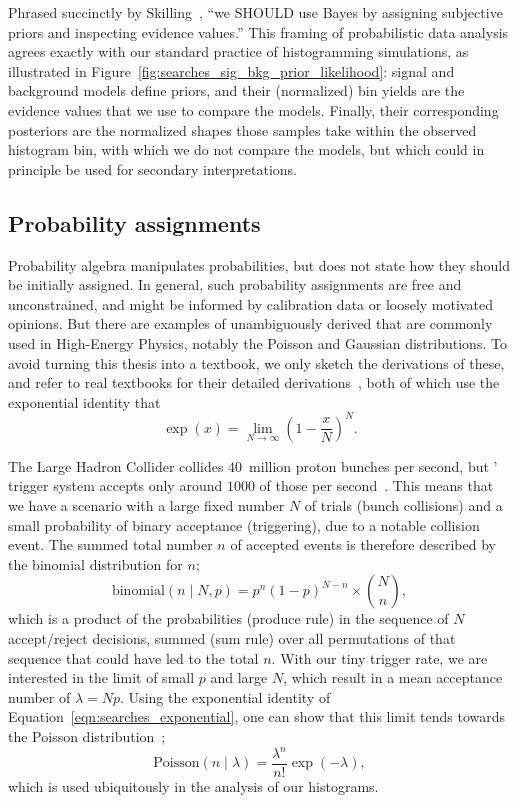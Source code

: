 Phrased succinctly by Skilling~\cite{skilling2008rant},
``we SHOULD use Bayes by assigning subjective priors and inspecting evidence
values.''
This framing of probabilistic data analysis agrees exactly with our standard
practice of histogramming simulations,
as illustrated in Figure~\ref{fig:searches_sig_bkg_prior_likelihood}:
signal and background models define priors, and their (normalized) bin yields
are the evidence values that we use to compare the models.
Finally, their corresponding posteriors are the normalized shapes those samples
take within the observed histogram bin, with which we do not compare the
models, but which could in principle be used for secondary interpretations.

\subsection{Probability assignments}
Probability algebra manipulates probabilities, but does not state how they
should be initially assigned.
In general, such probability assignments are free and unconstrained, and might
be informed by calibration data or loosely motivated opinions.
But there are examples of unambiguously derived that are commonly used in
High-Energy Physics, notably the Poisson and Gaussian distributions.
To avoid turning this thesis into a textbook, we only sketch the derivations
of these, and refer to real textbooks for their detailed
derivations~\cite{jaynes2003probability}, both of which use the exponential
identity that
\begin{equation}
\label{eqn:searches_exponential}
\exp(x) = \displaystyle \lim_{N \to \infty}
\left(1 - \frac{x}{N}\right)^N
.
\end{equation}

The Large Hadron Collider collides $40$~million proton bunches per second,
but \atlas' trigger system accepts only around $1000$ of
those per second~\cite{atlas2020trigger}.
This means that we have a scenario with a large fixed number $N$ of trials
(bunch collisions)
and a small probability of binary acceptance (triggering),
due to a notable collision event.
The summed total number $n$ of accepted events is therefore described by the
binomial distribution for $n$;
\begin{equation}
\label{eqn:searches_binomial}
\mathrm{binomial}(n\mid N, p) = p^n (1 - p)^{N - n} \times \binom{N}{n}
,
\end{equation}
which is a product of the probabilities (produce rule) in the sequence of $N$
accept/reject decisions, summed (sum rule) over all permutations of that sequence
that could have led to the total $n$.
With our tiny trigger rate, we are interested in the limit of small
$p$ and large $N$, which result in a mean acceptance number of $\lambda = Np$.
Using the exponential identity of Equation~\ref{eqn:searches_exponential}, one
can show that this limit tends towards the Poisson
distribution~\cite{jaynes2003probability};
\begin{equation}
\label{eqn:searches_poisson}
\mathrm{Poisson}(n\mid \lambda) = \frac{\lambda^n}{n!}\exp(-\lambda)
,
\end{equation}
which is used ubiquitously in the analysis of our histograms.

